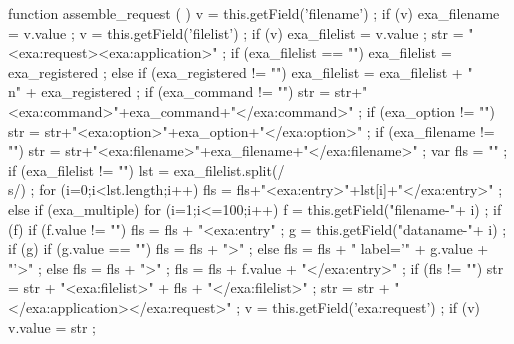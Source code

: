     function assemble_request ( ) {
        v = this.getField('filename') ;
        if (v) {
            exa_filename = v.value ;
        }
        v = this.getField('filelist') ;
        if (v) {
            exa_filelist = v.value ;
        }
        str = "<exa:request><exa:application>" ;
        if (exa_filelist == "") {
            exa_filelist = exa_registered ;
        } else { if (exa_registered != "") {
            exa_filelist = exa_filelist + "\\n" + exa_registered ;
        } }
        if (exa_command != "") {
            str = str+"<exa:command>"+exa_command+"</exa:command>" ;
        }
        if (exa_option != "") {
            str = str+"<exa:option>"+exa_option+"</exa:option>" ;
        }
        if (exa_filename != "") {
            str = str+"<exa:filename>"+exa_filename+"</exa:filename>" ;
        }
        var fls = "" ;
        if (exa_filelist != "") {
            lst = exa_filelist.split(/\\s/) ;
            for (i=0;i<lst.length;i++) {
                fls = fls+"<exa:entry>"+lst[i]+"</exa:entry>" ;
            }
        } else { if (exa_multiple) {
            for (i=1;i<=100;i++) {
                f = this.getField("filename-"+ i) ;
                if (f) { if (f.value != "") {
                    fls = fls + "<exa:entry" ;
                    g = this.getField("dataname-"+ i) ;
                    if (g) { if (g.value == "") {
                        fls = fls + ">" ;
                    } else {
                        fls = fls + " label='" + g.value + "'>" ;
                    } } else {
                        fls = fls + ">" ;
                    }
                    fls = fls + f.value + "</exa:entry>" ;
                } }
            }
        } }
        if (fls != "") {
            str = str + "<exa:filelist>" + fls + "</exa:filelist>" ;
        }
        str = str + "</exa:application></exa:request>" ;
        v = this.getField('exa:request') ;
        if (v) {
            v.value = str ;
        }
    }

